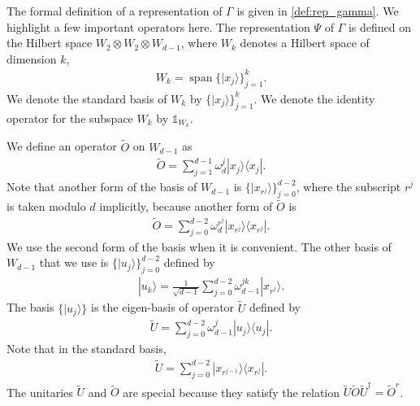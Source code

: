 \documentclass[11pt,letterpaper]{article}
\newcommand{\ket}[1]{|#1\rangle}
\newcommand{\ketbra}[2]{|#1\rangle\langle#2|}
\newcommand{\x}{\otimes}
\newcommand{\ct}{^{\dagger}}
\DeclareMathOperator{\spn}{span}
\newcommand{\1}{\mathbb{1}}
\newcommand{\tO}{\tilde{O}}
\newcommand{\tU}{\tilde{U}}
\theoremstyle{definition}
\begin{document}
The formal definition of a representation of $\Gamma$ is given in \cref{def:rep_gamma}. 
We highlight a few important operators here.
The representation $\Psi$ of $\Gamma$ is defined on the Hilbert space
$W_2 \x W_2 \x W_{d-1}$,
where $W_k$ denotes a Hilbert space of
dimension $k$,
\begin{align}
    \label{eq:basis}
    W_k = \spn\{ \ket{x_j} \}_{j=1}^k.
\end{align}
We denote the standard basis of $W_k$ by $\{\ket{x_j}\}_{j=1}^{k}$.
We denote the identity operator for the subspace $W_k$ by $\1_{W_k}$.


We define an operator $\tO$ on $W_{d-1}$ as
\begin{align*}
    \tO = \sum_{j=1}^{d-1} \omega_d^j \ketbra{x_j}{x_j}.
\end{align*}
Note that another form of the basis of $W_{d-1}$ is $\{\ket{x_{r^j}}\}_{j=0}^{d-2}$, 
where the subscript $r^j$ is taken modulo $d$ implicitly,
because another form of $\tO$ is 
\begin{align}
    \label{eq:O}
    \tO = \sum_{j=0}^{d-2} \omega_d^{r^j} \ketbra{x_{r^j}}{x_{r^j}}.
\end{align}
We use the second form of the basis when it is convenient.
The other basis of $W_{d-1}$ that we use is $\{ \ket{u_j} \}_{j=0}^{d-2}$ defined by
\begin{align*}
	\ket{u_k} = \frac{1}{\sqrt{d-1}} \sum_{j=0}^{d-2} \omega_{d-1}^{jk} \ket{x_{r^j}}.
\end{align*}
The basis $\{\ket{u_j}\}$ is the eigen-basis of operator $\tU$ defined by
\begin{align*}
    \tU = \sum_{j=0}^{d-2} \omega_{d-1}^j \ketbra{u_j}{u_j}.
\end{align*}
Note that in the standard basis, 
\begin{align}
    \label{eq:U}
    \tU = \sum_{j=0}^{d-2} \ketbra{x_{r^{j-1}}}{x_{r^j}}.
\end{align}
The unitaries $\tU$ and $\tO$ are special because 
they satisfy the relation $\tU \tO \tU\ct = \tO^r$.
\end{document}
